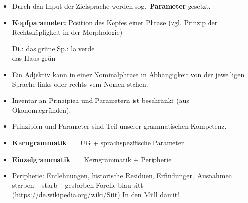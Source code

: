 \begin{frame}

\begin{itemize}

	\begin{block}{Parameter}
	Einzelsprachlich spezifische Regeln, die Möglichkeiten darstellen, die universalgrammatischen Prinzipien auszubuchstabieren.
	\end{block}
	
	\item Durch den Input der Zielsprache werden sog.\ \textbf{Parameter} gesetzt.
	\medskip
	\item \textbf{Kopfparameter:} Position des Kopfes einer Phrase (vgl. Prinzip der Rechtsköpfigkeit in der Morphologie)
	
	\eal
	\ex Dt.: das grüne 
	\ex
	\gll Sp.: la  verde\\
		{} das Haus grün\\
	\zl
	
	\item Ein Adjektiv kann in einer Nominalphrase in Abhängigkeit von der jeweiligen Sprache links oder rechts vom Nomen stehen.


\end{itemize}

\end{frame}


\begin{frame}

\begin{itemize}
	\item Inventar an Prinzipien und Parametern ist beschränkt (aus Ökonomiegründen).
	\item Prinzipien und Parameter sind Teil unserer grammatischen Kompetenz.
	\medskip
	\item \textbf{Kerngrammatik} $=$ UG $+$ sprachspezifische Parameter
	\item \textbf{Einzelgrammatik} $=$ Kerngrammatik $+$ Peripherie
	\medskip
	\item Peripherie: Entlehnungen, historische Residuen, Erfindungen, Ausnahmen \citep[vgl.][]{Nolda&Co14a}
	\eal
	\ex sterben -- starb -- gestorben
	\ex Forelle blau
	\ex sitt (\url{https://de.wikipedia.org/wiki/Sitt})
	\ex In den Müll damit! \citep[vgl.][]{MuellerG11a}
	\zl
	
\end{itemize}

\nocite{MyP17b}
\nocite{MyP&Co14b}

\end{frame}


